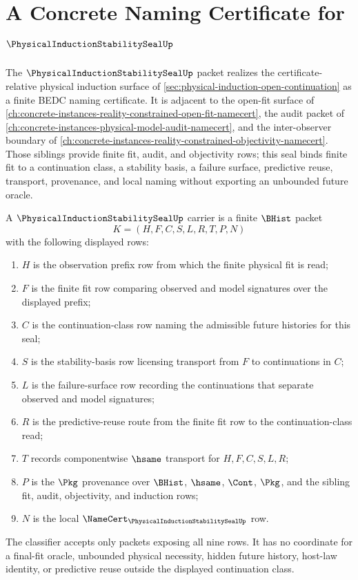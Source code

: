 \chapter{A Concrete Naming Certificate for $\PhysicalInductionStabilitySealUp$}
\label{ch:concrete-instances-physical-induction-stability-seal-namecert}

The $\PhysicalInductionStabilitySealUp$ packet realizes the certificate-relative physical induction surface of \autoref{sec:physical-induction-open-continuation} as a finite BEDC naming certificate. It is adjacent to the open-fit surface of \autoref{ch:concrete-instances-reality-constrained-open-fit-namecert}, the audit packet of \autoref{ch:concrete-instances-physical-model-audit-namecert}, and the inter-observer boundary of \autoref{ch:concrete-instances-reality-constrained-objectivity-namecert}. Those siblings provide finite fit, audit, and objectivity rows; this seal binds finite fit to a continuation class, a stability basis, a failure surface, predictive reuse, transport, provenance, and local naming without exporting an unbounded future oracle.

\begin{definition}
\label{def:physical-induction-stability-seal-carrier}
A $\PhysicalInductionStabilitySealUp$ carrier is a finite $\BHist$ packet
$$
K=(H,F,C,S,L,R,T,P,N)
$$
with the following displayed rows:
\begin{enumerate}
\item $H$ is the observation prefix row from which the finite physical fit is read;
\item $F$ is the finite fit row comparing observed and model signatures over the displayed prefix;
\item $C$ is the continuation-class row naming the admissible future histories for this seal;
\item $S$ is the stability-basis row licensing transport from $F$ to continuations in $C$;
\item $L$ is the failure-surface row recording the continuations that separate observed and model signatures;
\item $R$ is the predictive-reuse route from the finite fit row to the continuation-class read;
\item $T$ records componentwise $\hsame$ transport for $H,F,C,S,L,R$;
\item $P$ is the $\Pkg$ provenance over $\BHist$, $\hsame$, $\Cont$, $\Pkg$, and the sibling fit, audit, objectivity, and induction rows;
\item $N$ is the local $\NameCert_{\PhysicalInductionStabilitySealUp}$ row.
\end{enumerate}
The classifier accepts only packets exposing all nine rows. It has no coordinate for a final-fit oracle, unbounded physical necessity, hidden future history, host-law identity, or predictive reuse outside the displayed continuation class.
\end{definition}

